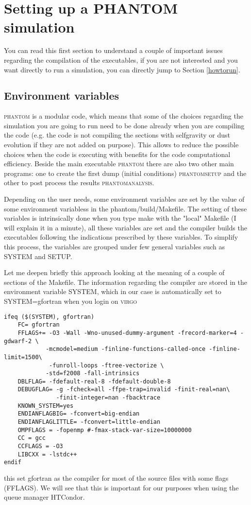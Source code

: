 \documentclass[10pt,a4paper,twoside]{article} %
\begin{document}
\section{Setting up a PHANTOM simulation}

You can read this first section to understand a couple of important issues regarding the compilation of the executables, if you are not interested and you want directly to run a simulation, you can directly jump to Section \ref{howtorun}.

\subsection{Environment variables}\label{envvar}

\textsc{phantom} is a modular code, which means that some of the choices regarding the simulation you are going to run need to be done already when you are compiling the code (e.g. the code is not compiling the sections with selfgravity or dust evolution if they are not added on purpose). This allows to reduce the possible choices when the code is executing with benefits for the code computational efficiency. Beside the main executable \textsc{phantom} there are also two other main programs: one to create the first dump (initial conditions) \textsc{phantomsetup} and the other to post process the results \textsc{phantomanalysis}.

Depending on the user needs, some environment variables are set by the value of some environment variabless in the phantom/build/Makefile. The setting of these variables is intrinsically done when you type make with the "local" Makefile (I will explain it in a minute), all these variables are set and the compiler builds the executables following the indications prescribed by these variables. To simplify this process, the variables are grouped under few general variables such as SYSTEM and SETUP.

Let me deepen briefly this approach looking at the meaning of a couple of sections of the Makefile.
The information regarding the compiler are stored in the environment variable SYSTEM, which in our case is automatically set to SYSTEM=gfortran when you login on \textsc{virgo}
\begin{verbatim}
ifeq ($(SYSTEM), gfortran)
    FC= gfortran
    FFLAGS+= -O3 -Wall -Wno-unused-dummy-argument -frecord-marker=4 -gdwarf-2 \
            -mcmodel=medium -finline-functions-called-once -finline-limit=1500\
             -funroll-loops -ftree-vectorize \
            -std=f2008 -fall-intrinsics
    DBLFLAG= -fdefault-real-8 -fdefault-double-8
    DEBUGFLAG= -g -fcheck=all -ffpe-trap=invalid -finit-real=nan\
               -finit-integer=nan -fbacktrace
    KNOWN_SYSTEM=yes
    ENDIANFLAGBIG= -fconvert=big-endian
    ENDIANFLAGLITTLE= -fconvert=little-endian
    OMPFLAGS = -fopenmp #-fmax-stack-var-size=10000000
    CC = gcc
    CCFLAGS = -O3
    LIBCXX = -lstdc++
endif
\end{verbatim}
this set gfortran as the compiler for most of the source files with some flags (FFLAGS). We will see that this is important for our purposes when using the queue manager HTCondor.
\end{document}
